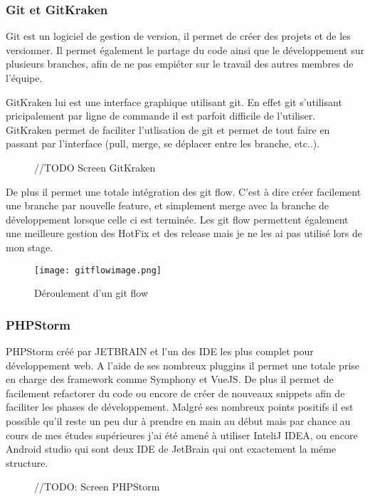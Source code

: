 \subsubsection{Git et GitKraken}
Git est un logiciel de gestion de version, il permet de créer des projets et de les versionner. Il permet également le partage du code ainsi que le développement sur plusieurs branches, afin de ne pas empiéter sur le travail des autres membres de l'équipe.

GitKraken lui est une interface graphique utilisant git. En effet git s'utilisant pricipalement par ligne de commande il est parfoit difficile de l'utiliser. GitKraken permet de faciliter l'utlisation de git et permet de tout faire en passant par l'interface (pull, merge, se déplacer entre les branche, etc..).

\begin{figure}[htbp]
    \center
    //TODO Screen GitKraken
\end{figure}

De plus il permet une totale intégration des git flow. C'est à dire créer facilement une branche par nouvelle feature, et simplement merge avec la branche de développement lorsque celle ci est terminée.
Les git flow permettent également une meilleure gestion des HotFix et des release mais je ne les ai pas utilisé lors de mon stage. 

\begin{figure}[htbp]
    \center
\texttt{[image: gitflowimage.png]}
\caption{Déroulement d'un git flow}
\end{figure}


\subsubsection{PHPStorm}

PHPStorm créé par JETBRAIN et l'un des IDE les plus complet pour développement web.
A l'aide de ses nombreux pluggins il permet une totale prise en charge des framework comme Symphony et VueJS. De plus il permet de facilement refactorer du code  ou encore de créer de nouveaux snippets afin de faciliter les phases de développement.
Malgré ses nombreux points positifs il est possible qu'il reste un peu dur à prendre en main au début mais par chance au cours de mes études supérieures j'ai été amené à utiliser InteliJ IDEA, ou encore Android studio qui sont deux IDE de JetBrain qui ont exactement la méme structure. 

\begin{figure}[htbp]
    \center 
    //TODO: Screen PHPStorm
\end{figure}


